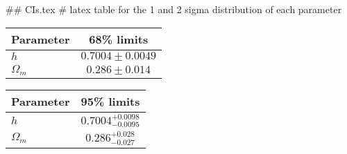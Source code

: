 ## CIs.tex
# latex table for the 1 and 2 sigma distribution of each parameter

\begin{tabular} { l  c}
 Parameter &  68\% limits\\
\hline
{\boldmath$h              $} & $0.7004\pm 0.0049          $\\
{\boldmath$\Omega_m       $} & $0.286\pm 0.014            $\\
\hline
\end{tabular}

\begin{tabular} { l  c}
 Parameter &  95\% limits\\
\hline
{\boldmath$h              $} & $0.7004^{+0.0098}_{-0.0095}$\\
{\boldmath$\Omega_m       $} & $0.286^{+0.028}_{-0.027}   $\\
\hline
\end{tabular}
